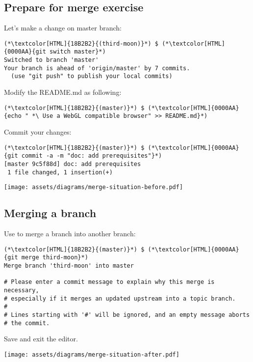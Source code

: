 \subsection{Prepare for merge exercise}
\begin{frame}[fragile]
  \subslidetitle

  Let's make a change on master branch:
  \begin{lstlisting}
(*\textcolor[HTML]{18B2B2}{(third-moon)}*) $ (*\textcolor[HTML]{0000AA}{git switch master}*)
Switched to branch 'master'
Your branch is ahead of 'origin/master' by 7 commits.
  (use "git push" to publish your local commits)
\end{lstlisting}

  Modify the README.md as following:
  \begin{lstlisting}
(*\textcolor[HTML]{18B2B2}{(master)}*) $ (*\textcolor[HTML]{0000AA}{echo " *\ Use a WebGL compatible browser" >> README.md}*)
\end{lstlisting}

  Commit your changes:
  \begin{lstlisting}
(*\textcolor[HTML]{18B2B2}{(master)}*) $ (*\textcolor[HTML]{0000AA}{git commit -a -m "doc: add prerequisites"}*)
[master 9c5f88d] doc: add prerequisites
 1 file changed, 1 insertion(+)
\end{lstlisting}

  \centerline{\texttt{[image: assets/diagrams/merge-situation-before.pdf]}}

\end{frame}

\subsection{Merging a branch}
\begin{frame}[fragile]
  \subslidetitle

  Use  to merge a branch into another branch:

  \begin{lstlisting}
(*\textcolor[HTML]{18B2B2}{(master)}*) $ (*\textcolor[HTML]{0000AA}{git merge third-moon}*)
Merge branch 'third-moon' into master

# Please enter a commit message to explain why this merge is necessary,
# especially if it merges an updated upstream into a topic branch.
#
# Lines starting with '#' will be ignored, and an empty message aborts
# the commit.
\end{lstlisting}

  Save and exit the editor.
  \centerline{\texttt{[image: assets/diagrams/merge-situation-after.pdf]}}

\end{frame}

